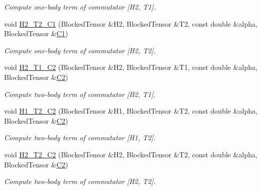 \begin{DoxyCompactItemize}
\begin{DoxyCompactList}\small\item\em Compute one-\/body term of commutator \mbox{[}H2, T1\mbox{]}. \end{DoxyCompactList}\item 
void \mbox{\hyperlink{classforte_1_1_m_a_s_t_e_r___d_s_r_g_af94d68486184ec068b70db3891977346}{H2\+\_\+\+T2\+\_\+\+C1}} (Blocked\+Tensor \&H2, Blocked\+Tensor \&T2, const double \&alpha, Blocked\+Tensor \&\mbox{\hyperlink{namespaceforte_abe00ec86d0015c0f2b6ac298c6e428e4a1a2ddc2db4693cfd16d534cde5572cc1}{C1}})
\begin{DoxyCompactList}\small\item\em Compute one-\/body term of commutator \mbox{[}H2, T2\mbox{]}. \end{DoxyCompactList}\item 
void \mbox{\hyperlink{classforte_1_1_m_a_s_t_e_r___d_s_r_g_a662113c1c718db206ab118b2dbd85b65}{H2\+\_\+\+T1\+\_\+\+C2}} (Blocked\+Tensor \&H2, Blocked\+Tensor \&T1, const double \&alpha, Blocked\+Tensor \&\mbox{\hyperlink{namespaceforte_abe00ec86d0015c0f2b6ac298c6e428e4af1a543f5a2c5d49bc5dde298fcf716e4}{C2}})
\begin{DoxyCompactList}\small\item\em Compute two-\/body term of commutator \mbox{[}H2, T1\mbox{]}. \end{DoxyCompactList}\item 
void \mbox{\hyperlink{classforte_1_1_m_a_s_t_e_r___d_s_r_g_a7923e4cf5d48d8e877c17b8155a653e1}{H1\+\_\+\+T2\+\_\+\+C2}} (Blocked\+Tensor \&H1, Blocked\+Tensor \&T2, const double \&alpha, Blocked\+Tensor \&\mbox{\hyperlink{namespaceforte_abe00ec86d0015c0f2b6ac298c6e428e4af1a543f5a2c5d49bc5dde298fcf716e4}{C2}})
\begin{DoxyCompactList}\small\item\em Compute two-\/body term of commutator \mbox{[}H1, T2\mbox{]}. \end{DoxyCompactList}\item 
void \mbox{\hyperlink{classforte_1_1_m_a_s_t_e_r___d_s_r_g_a39a44ecb9997a978aecd58d470712c1c}{H2\+\_\+\+T2\+\_\+\+C2}} (Blocked\+Tensor \&H2, Blocked\+Tensor \&T2, const double \&alpha, Blocked\+Tensor \&\mbox{\hyperlink{namespaceforte_abe00ec86d0015c0f2b6ac298c6e428e4af1a543f5a2c5d49bc5dde298fcf716e4}{C2}})
\begin{DoxyCompactList}\small\item\em Compute two-\/body term of commutator \mbox{[}H2, T2\mbox{]}. \end{DoxyCompactList}\item 

\end{DoxyCompactItemize}
